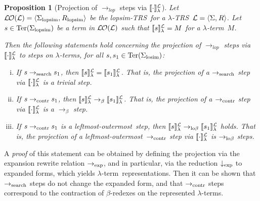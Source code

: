 \documentclass[
submission
]{dmtcs-episciences-tampered}
\newcommand{\fap}[2]{#1({#2})}
\newcommand{\indap}[2]{#1 _{#2}}
\newcommand{\supap}[2]{#1 ^{#2}}
\newcommand{\pap}{\supap}
\newcommand{\nb}{\nobreakdash}
\newcommand{\nf}{\normalfont}
\newcommand{\tuple}[1]{\langle #1 \rangle}
\newcommand{\tuplespace}{\hspace*{0.5pt}}
\newcommand{\pair}[2]{\tuple{#1, \tuplespace #2}}
\newcommand{\ater}{s}
\newcommand{\ateri}{\indap{\ater}}
\newcommand{\asig}{\Sigma}
\newcommand{\asiglosim}{\indap{\asig}{\scriptlosim}}
\newcommand{\asiglopsim}{\indap{\asig}{\scriptlopsim}}
\newcommand{\arules}{R}
\newcommand{\ruleslopsim}{\indap{\arules}{\scriptlopsim}}
\newcommand{\alTRS}{{\cal L}}
\newcommand{\TRS}{TRS}
\newcommand{\stermsover}{\text{\nf Ter}}
\newcommand{\termsover}{\fap{\stermsover}}
\newcommand{\slop}{\textit{lop}}\newcommand{\slopstar}{\pap{\slop}{*}}
\newcommand{\denlterwrt}[2]{\llbracket{#2}\rrbracket^{#1}_{\sslabs}}
\newcommand{\lopsimTRS}{lopsim-TRS}
\newcommand{\alter}{M}
\newcommand{\sslabs}{\lambda}
\newcommand{\sred}{\to}
\newcommand{\sredi}{\indap{\sred}}
\newcommand{\scriptlosim}{\text{\nf losim}}
\newcommand{\scriptlopsim}{\text{\nf lopsim}}
\newcommand{\scriptexp}{\text{\nf exp}}
\newcommand{\scriptsearch}{\text{\nf search}}
\newcommand{\scriptcontract}{\text{\nf contr}}
\newcommand{\ssearchred}{\sredi{\scriptsearch}}
\newcommand{\searchred}{\mathrel{\ssearchred}}
\newcommand{\scontractred}{\sredi{\scriptcontract}}
\newcommand{\contractred}{\mathrel{\scontractred}}
\newcommand{\scriptlobeta}{\text{\nf lo}\beta}
\newcommand{\slobetared}{\sredi{\scriptlobeta}}
\newcommand{\lobetared}{\mathrel{\slobetared}}
\newcommand{\slopsimred}{\sredi{\slop}}
\newcommand{\sexpred}{\sredi{\scriptexp}}
\newcommand{\sbetared}{\sred_{\beta}}
\newcommand{\betared}{\mathrel{\sbetared}}
\newcommand{\sexprednf}{{\downarrow_{\scriptexp}}}
\newcommand{\lambdaterm}{$\lambda$\nb-term}
\newcommand{\lambdaterms}{\lambdaterm{s}}
\newcommand{\betaredex}{$\beta$\nb-re\-dex}
\newcommand{\lo}{left\-most-outer\-most}
\newcommand{\lTRS}{$\lambda$\hspace*{-0.5pt}\nb-\hspace*{-0.5pt}\TRS}
\theoremstyle{plain}
\newtheorem{proposition}[theorem]{Proposition}
\theoremstyle{definition}
\begin{document}
\begin{proposition}[Projection of $\slopsimred$ steps via $\denlterwrt{\alTRS}{\cdot}$]
    \label{prop:projection}
  Let $\lopsimTRSwrt{\alTRS} = \pair{\asiglopsim}{\ruleslopsim}$ be the \lopsimTRS\ for 
  a \lTRS~$\alTRS = \pair{\asig}{\arules}$.
  Let $\ater\in\termsover{\asiglopsim}$
  be a term in $\lopsimTRSwrt{\alTRS}$ such that $\denlterwrt{\alTRS}{\ater} = \alter$ for a \lambdaterm~$\alter$.
  
  Then the following statements hold concerning the projection of $\slopsimred$ steps via $\denlterwrt{\alTRS}{\cdot}$ 
  to steps on \lambdaterms, for all $\ater,\ateri{1}\in\termsover{\asiglosim}$:
  \begin{enumerate}[(i)]\setlength{\itemsep}{0ex} 
    \item
      If $\ater \searchred \ateri{1}$, then $\denlterwrt{\alTRS}{\ater} = \denlterwrt{\alTRS}{\ateri{1}}$.
      That is, the projection of a $\ssearchred$ step via $\denlterwrt{\alTRS}{\cdot}$ is a trivial step.
    \item  
      If $\ater \contractred \ateri{1}$, then $\denlterwrt{\alTRS}{\ater} \betared \denlterwrt{\alTRS}{\ateri{1}}$.
      That is, the projection of a $\scontractred$ step via $\denlterwrt{\alTRS}{\cdot}$ is a $\sbetared$ step.
    \item  
      If $\ater \contractred \ateri{1}$ is a \lo\ step, then $\denlterwrt{\alTRS}{\ater} \lobetared \denlterwrt{\alTRS}{\ateri{1}}$ holds.
      That is, the projection of a \lo\ $\scontractred$ step via $\denlterwrt{\alTRS}{\cdot}$ is $\slobetared$ steps.
  \end{enumerate}
\end{proposition}

A \emph{proof} of this statement can be obtained by defining the projection via the expansion rewrite relation $\sexpred$,
and in particular, via the reduction $\sexprednf$ to expanded forms, which yields \lambdaterm\ representations.
Then it can be shown that $\ssearchred$ steps do not change the expanded form, and that $\scontractred$ steps
correspond to the contraction of \betaredex{es} on the represented \lambdaterms. 
\end{document}

